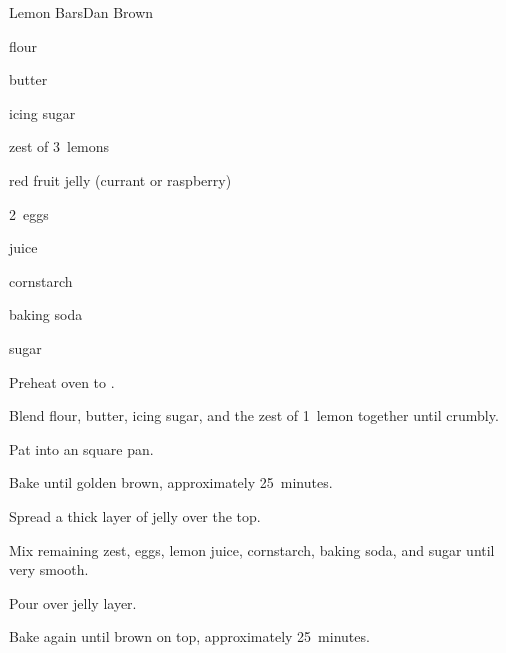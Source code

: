 \begin{recipe}{Lemon Bars}{Dan Brown}{}

\begin{ingredients}
\item {} flour
\item \C{\half} butter
\item \C{\half} icing sugar
\item zest of 3~lemons
\item \C{\third} red fruit jelly (currant or raspberry)
\item 2~eggs
\item \C{\third}  juice
\item {} cornstarch
\item \tp{\half} baking soda
\item {} sugar
\end{ingredients}

\begin{directions}
\item Preheat oven to .
\item Blend flour, butter, icing sugar, and the zest of 1~lemon together until crumbly.
\item Pat into an  square pan.
\item Bake until golden brown, approximately 25~minutes.
\item Spread a thick layer of jelly over the top.
\item Mix remaining zest, eggs, lemon juice, cornstarch, baking soda, and sugar until very smooth.
\item Pour over jelly layer.
\item Bake again until brown on top, approximately 25~minutes.
\end{directions}

\end{recipe}
